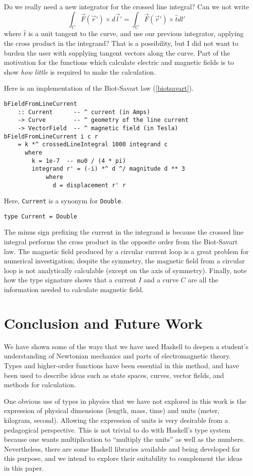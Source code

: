 \documentclass[11pt]{article}
\begin{document}
Do we really need a new integrator for the crossed line integral?
Can we not write 
\[
\int_C \vec{F}(\vec{r}') \times d\vec{l}' = \int_C \vec{F}(\vec{r}') \times \hat{t} dl'
\]
where $\hat{t}$ is a unit tangent to the curve, and use our previous integrator,
applying the cross product in the integrand?
That is a possibility, but I did not want to burden the user with supplying
tangent vectors along the curve.  Part of the motivation for the functions
which calculate electric and magnetic fields is to show \emph{how little}
is required to make the calculation.

Here is an implementation of the Biot-Savart law (\ref{biotsavart}).
\begin{verbatim}
bFieldFromLineCurrent
    :: Current      -- ^ current (in Amps)
    -> Curve        -- ^ geometry of the line current
    -> VectorField  -- ^ magnetic field (in Tesla)
bFieldFromLineCurrent i c r
    = k *^ crossedLineIntegral 1000 integrand c
      where
        k = 1e-7  -- mu0 / (4 * pi)
        integrand r' = (-i) *^ d ^/ magnitude d ** 3
            where
              d = displacement r' r
\end{verbatim}
Here, \verb|Current| is a synonym for \verb|Double|.
\begin{verbatim}
type Current = Double
\end{verbatim}
The minus sign prefixing the current in the integrand is because the crossed line integral
performs the cross product in the opposite order from the Biot-Savart law.
The magnetic field produced by a circular current loop is a great problem for
numerical investigation; despite the symmetry, the magnetic field from a circular loop is not
analytically calculable (except on the axis of symmetry).
Finally, note how the type signature shows that a current $I$
and a curve $C$ are all the information needed to calculate magnetic field.

\section{Conclusion and Future Work}

We have shown some of the ways that we have used Haskell to deepen a student's
understanding of Newtonian mechanics and parts of electromagnetic theory.
Types and higher-order functions have been essential in this method,
and have been used to describe ideas such as state spaces, curves,
vector fields, and methods for calculation.

One obvious use of types in physics that we have not explored in this work
is the expression of physical dimensions (length, mass, time) and units
(meter, kilogram, second).  Allowing the expression of units is very
desirable from a pedagogical perspective.  This is not trivial to do
with Haskell's type system because one wants multiplication to
``multiply the units'' as well as the numbers.  Nevertheless, there
are some Haskell libraries available and being developed for this purpose,
and we intend to explore their suitability to complement the ideas
in this paper.
\end{document}
